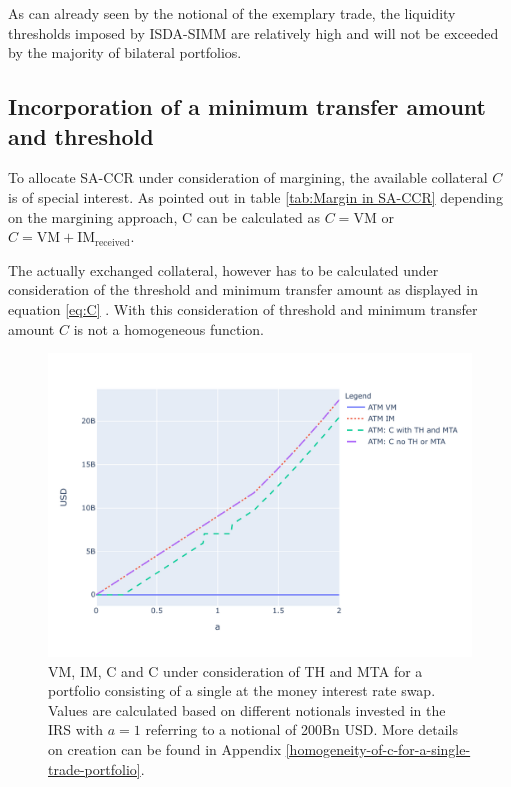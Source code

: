 \documentclass[../Thesis_AHoecherl.tex]{subfiles}
\begin{document}
    As can already seen by the notional of the exemplary trade, the liquidity thresholds imposed by ISDA-SIMM are relatively high and will not be exceeded by the majority of bilateral portfolios.


    \subsection{Incorporation of a minimum transfer amount and threshold}

    To allocate \gls{SA-CCR} under consideration of margining, the available collateral $C$ is of special interest. As pointed out in table \ref{tab:Margin in SA-CCR} depending on the margining approach, C can be calculated as $C = \text{VM}$ or $C = \text{VM} + \text{IM}_{\text{received}}$.

    The actually exchanged collateral, however has to be calculated under consideration of the threshold and minimum transfer amount as displayed in equation \ref{eq:C} . With this consideration of threshold and minimum transfer amount $C$ is not a homogeneous function. 

    \begin{figure}
        \centering
        \includegraphics{Graphics/C_and_its_components_for_ATM_IRS.pdf}
        \caption{VM, IM, C and C under consideration of TH and MTA for a portfolio consisting of a single at the money interest rate swap. Values are calculated based on different notionals invested in the IRS with $a=1$ referring to a notional of 200Bn USD. More details on creation can be found in Appendix \ref{homogeneity-of-c-for-a-single-trade-portfolio}.}
        \label{fig:C for ATM IRS}
    \end{figure}
\end{document}
